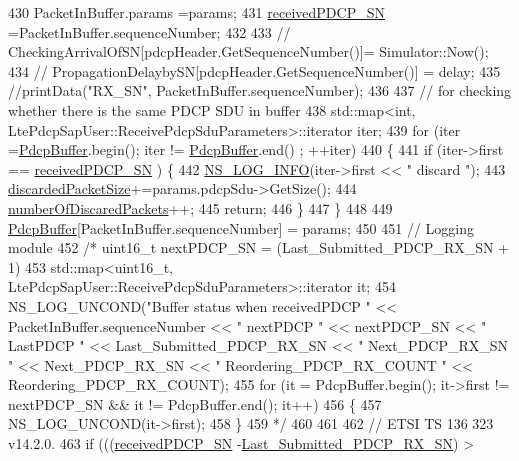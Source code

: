 \begin{DoxyCode}
430   PacketInBuffer.params =params;
431   \hyperlink{classns3_1_1McUePdcp_a87a21da01ea037ef1146091164f1f3f5}{receivedPDCP\_SN} =PacketInBuffer.sequenceNumber;
432 
433 \textcolor{comment}{//  CheckingArrivalOfSN[pdcpHeader.GetSequenceNumber()]= Simulator::Now();}
434 \textcolor{comment}{//  PropagationDelaybySN[pdcpHeader.GetSequenceNumber()] = delay;}
435   \textcolor{comment}{//printData("RX\_SN", PacketInBuffer.sequenceNumber);}
436 
437   \textcolor{comment}{// for checking whether there is the same PDCP SDU in buffer}
438   std::map<int, LtePdcpSapUser::ReceivePdcpSduParameters>::iterator iter;
439   \textcolor{keywordflow}{for} (iter =\hyperlink{classns3_1_1McUePdcp_aaca29474fb58d037d727e503c44490b5}{PdcpBuffer}.begin(); iter != \hyperlink{classns3_1_1McUePdcp_aaca29474fb58d037d727e503c44490b5}{PdcpBuffer}.end() ; ++iter)
440   \{
441     \textcolor{keywordflow}{if} (iter->first == \hyperlink{classns3_1_1McUePdcp_a87a21da01ea037ef1146091164f1f3f5}{receivedPDCP\_SN} ) \{
442         \hyperlink{group__logging_gafbd73ee2cf9f26b319f49086d8e860fb}{NS\_LOG\_INFO}(iter->first << \textcolor{stringliteral}{"   discard "});
443         \hyperlink{classns3_1_1McUePdcp_ae7935800f033c5e63ec66e18c6c91776}{discardedPacketSize}+=params.pdcpSdu->GetSize();
444         \hyperlink{classns3_1_1McUePdcp_a2d97086fdd2e34fb5543e9599725b087}{numberOfDiscaredPackets}++;
445         \textcolor{keywordflow}{return};
446     \}
447   \}
448 
449   \hyperlink{classns3_1_1McUePdcp_aaca29474fb58d037d727e503c44490b5}{PdcpBuffer}[PacketInBuffer.sequenceNumber] = params;
450 
451 \textcolor{comment}{// Logging module}
452 \textcolor{comment}{/*    uint16\_t nextPDCP\_SN = (Last\_Submitted\_PDCP\_RX\_SN + 1)%
453 \textcolor{comment}{    std::map<uint16\_t, LtePdcpSapUser::ReceivePdcpSduParameters>::iterator it;}
454 \textcolor{comment}{NS\_LOG\_UNCOND("Buffer status when receivedPDCP " << PacketInBuffer.sequenceNumber << " nextPDCP " <<
       nextPDCP\_SN << " LastPDCP " << Last\_Submitted\_PDCP\_RX\_SN << " Next\_PDCP\_RX\_SN " << Next\_PDCP\_RX\_SN << "
       Reordering\_PDCP\_RX\_COUNT " << Reordering\_PDCP\_RX\_COUNT);}
455 \textcolor{comment}{    for (it = PdcpBuffer.begin(); it->first != nextPDCP\_SN && it != PdcpBuffer.end(); it++)}
456 \textcolor{comment}{    \{}
457 \textcolor{comment}{NS\_LOG\_UNCOND(it->first);}
458 \textcolor{comment}{    \}}
459 \textcolor{comment}{*/}
460 
461 
462   \textcolor{comment}{// ETSI TS 136 323 v14.2.0.}
463   \textcolor{keywordflow}{if} (((\hyperlink{classns3_1_1McUePdcp_a87a21da01ea037ef1146091164f1f3f5}{receivedPDCP\_SN} -\hyperlink{classns3_1_1McUePdcp_a3706f4ac613b70145c22b7b03649db6b}{Last\_Submitted\_PDCP\_RX\_SN}) > 
}
\end{DoxyCode}
